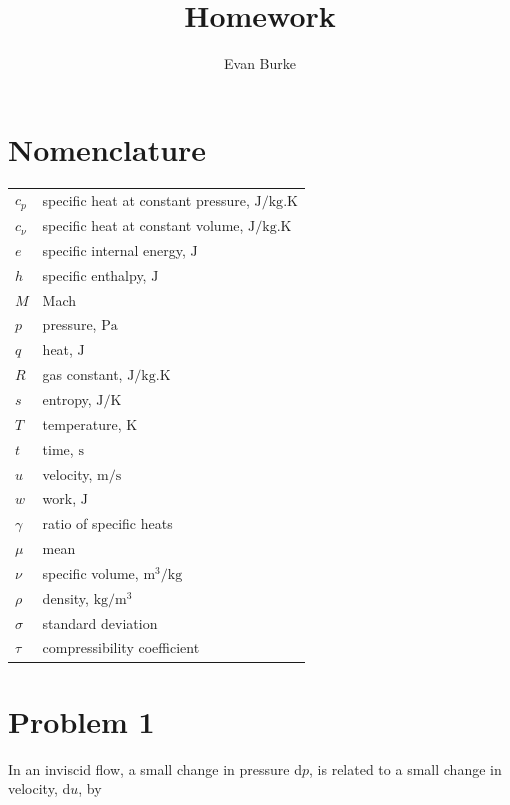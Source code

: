 \documentclass[12pt,letterpaper]{article}
\author{Evan Burke}
\title{Homework \homeworknumber}
\begin{document}
	\graphicspath{{../images}}
	
	
	\tableofcontents

	\newpage
	
	\section*{Nomenclature}
	
	{\renewcommand\arraystretch{1.0}
		\noindent\begin{longtable}{@{}l @{\quad=\quad} l@{}}

			$c_p$ & specific heat at constant pressure, $\unit{\joule/\kilogram.\kelvin}$\\
			$c_\nu$ & specific heat at constant volume, $\unit{\joule/\kilogram.\kelvin}$\\
			$e$ & specific internal energy, $\unit{\joule}$\\
			$h$ & specific enthalpy, $\unit{\joule}$ \\
			$M$ & Mach \\
			$p$  & pressure, $\unit{\pascal}$ \\
			$q$ & heat, $\unit{\joule}$\\
			$R$ & gas constant, $\unit{\joule/\kilogram.\kelvin}$ \\
			$s$ & entropy, $\unit{\joule/\kelvin}$\\
			$T$ & temperature, $\unit{\kelvin}$\\
			$t$ & time, $\unit{\second}$\\
			$u$& velocity, $\unit{\meter/\second}$ \\
			$w$ & work, $\unit{\joule}$\\
			$\gamma$ & ratio of specific heats\\
			$\mu$ & mean\\
			$\nu$ & specific volume, $\unit{\meter^3/\kilogram}$\\
			$\rho$ & density, $\unit{\kilogram/\meter^3}$ \\
			$\sigma$ & standard deviation\\
			$\tau$ & compressibility coefficient 
	\end{longtable}}
	
	\newpage
	
	\section*{Problem 1}
	In an inviscid flow, a small change in pressure d$p$, is related to a small change in velocity, d$u$, by
\end{document}
